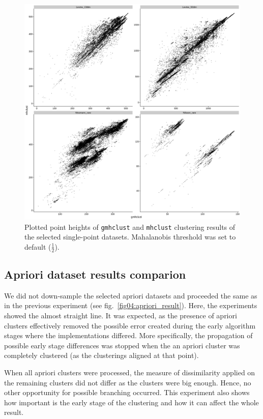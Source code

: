 \begin{figure}\centering
	\includegraphics[width=\linewidth]{img/single_result}
	\caption{Plotted point heights of \texttt{gmhclust} and \texttt{mhclust} clustering results of the selected single-point datasets. Mahalanobis threshold was set to default ($\frac{1}{2}$).}
	\label{fig04:single_result}
\end{figure}

\subsection{Apriori dataset results comparion}

We did not down-sample the selected apriori datasets and proceeded the same as in the previous experiment (see fig.~\ref{fig04:apriori_result}). Here, the experiments showed the almost straight line. It was expected, as the presence of apriori clusters effectively removed the possible error created during the early algorithm stages where the implementations differed. More specifically, the propagation of possible early stage differences was stopped when the an apriori cluster was completely clustered (as the clusterings aligned at that point).

When all apriori clusters were processed, the measure of dissimilarity applied on the remaining clusters did not differ as the clusters were big enough. Hence, no other opportunity for possible branching occurred. This experiment also shows how important is the early stage of the clustering and how it can affect the whole result.

